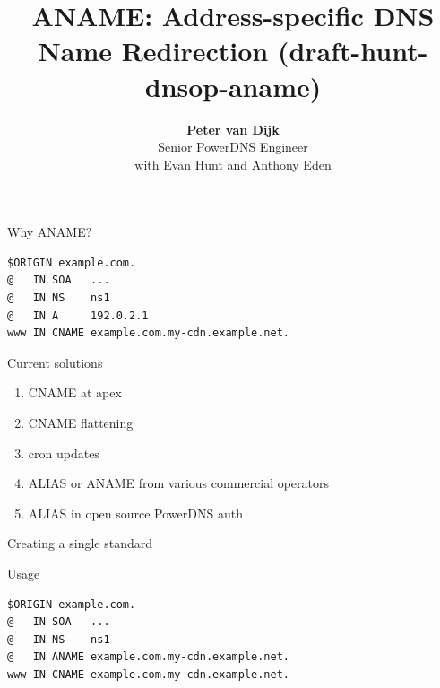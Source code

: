 \documentclass{beamer}
\title[aname]{ANAME: Address-specific DNS Name Redirection (draft-hunt-dnsop-aname)}
\author{\textbf{Peter van Dijk}\\Senior PowerDNS Engineer\\with Evan Hunt and Anthony Eden}
\date{}
\begin{document}
\begin{frame}
  \titlepage
\end{frame}

\begin{frame}[fragile]{Why ANAME?}
  \begin{verbatim}
$ORIGIN example.com.
@   IN SOA   ...
@   IN NS    ns1
@   IN A     192.0.2.1
www IN CNAME example.com.my-cdn.example.net.
  \end{verbatim}
\end{frame}

\begin{frame}{Current solutions}
  \begin{enumerate}
    \item CNAME at apex
    \item CNAME flattening
    \item cron updates
    \item ALIAS or ANAME from various commercial operators
    \item ALIAS in open source PowerDNS auth
  \end{enumerate}
\end{frame}

\begin{frame}{Creating a single standard}
\end{frame}

\begin{frame}[fragile]{Usage}
  \begin{verbatim}
$ORIGIN example.com.
@   IN SOA   ...
@   IN NS    ns1
@   IN ANAME example.com.my-cdn.example.net.
www IN CNAME example.com.my-cdn.example.net.
  \end{verbatim}
\end{frame}
\end{document}

